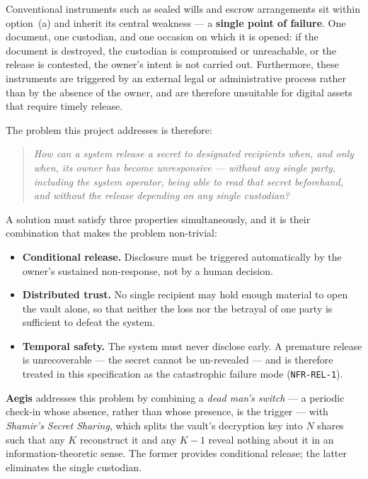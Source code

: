 \documentclass[11pt,a4paper]{article}
\newcommand{\ReqID}[1]{\texttt{#1}}
\begin{document}
Conventional instruments such as sealed wills and escrow arrangements sit within
option~(a) and inherit its central weakness --- a \textbf{single point of
failure}. One document, one custodian, and one occasion on which it is opened: if
the document is destroyed, the custodian is compromised or unreachable, or the
release is contested, the owner's intent is not carried out. Furthermore, these
instruments are triggered by an external legal or administrative process rather
than by the absence of the owner, and are therefore unsuitable for digital assets
that require timely release.

The problem this project addresses is therefore:

\begin{quote}
  \itshape How can a system release a secret to designated recipients when, and
  only when, its owner has become unresponsive --- without any single party,
  including the system operator, being able to read that secret beforehand, and
  without the release depending on any single custodian?
\end{quote}

A solution must satisfy three properties simultaneously, and it is their
combination that makes the problem non-trivial:
\begin{itemize}[leftmargin=0.7cm]
  \item \textbf{Conditional release.} Disclosure must be triggered automatically
    by the owner's sustained non-response, not by a human decision.
  \item \textbf{Distributed trust.} No single recipient may hold enough material
    to open the vault alone, so that neither the loss nor the betrayal of one
    party is sufficient to defeat the system.
  \item \textbf{Temporal safety.} The system must never disclose early. A
    premature release is unrecoverable --- the secret cannot be un-revealed ---
    and is therefore treated in this specification as the catastrophic failure
    mode (\ReqID{NFR-REL-1}).
\end{itemize}

\textbf{Aegis} addresses this problem by combining a \emph{dead man's switch} ---
a periodic check-in whose absence, rather than whose presence, is the trigger ---
with \emph{Shamir's Secret Sharing}, which splits the vault's decryption key into
$N$ shares such that any $K$ reconstruct it and any $K-1$ reveal nothing about it
in an information-theoretic sense. The former provides conditional release; the
latter eliminates the single custodian.
\end{document}
